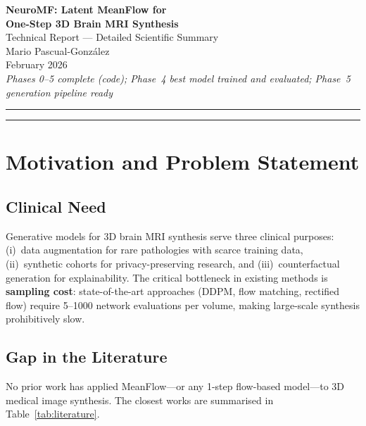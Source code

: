 \documentclass[11pt,a4paper]{article}
\begin{document}
\begin{center}
  {\LARGE\bfseries NeuroMF: Latent MeanFlow for\\[4pt] One-Step 3D Brain MRI Synthesis}\\[18pt]
  {\large Technical Report --- Detailed Scientific Summary}\\[12pt]
  {\large Mario Pascual-Gonz\'{a}lez}\\[6pt]
  {\normalsize February 2026}\\[6pt]
  {\small\itshape Phases 0--5 complete (code); Phase~4 best model trained and evaluated;
  Phase~5 generation pipeline ready}
\end{center}

\vspace{1em}
\hrule
\vspace{0.5em}

\tableofcontents

\vspace{1em}
\hrule
\newpage

\section{Motivation and Problem Statement}
\label{sec:motivation}

\subsection{Clinical Need}

Generative models for 3D brain MRI synthesis serve three clinical purposes:
(i)~data augmentation for rare pathologies with scarce training data,
(ii)~synthetic cohorts for privacy-preserving research, and
(iii)~counterfactual generation for explainability.
The critical bottleneck in existing methods is \textbf{sampling cost}:
state-of-the-art approaches (DDPM, flow matching, rectified flow)
require 5--1000 network evaluations per volume, making large-scale synthesis
prohibitively slow.

\subsection{Gap in the Literature}

No prior work has applied MeanFlow---or any 1-step flow-based model---to 3D
medical image synthesis. The closest works are summarised in
Table~\ref{tab:literature}.
\end{document}
